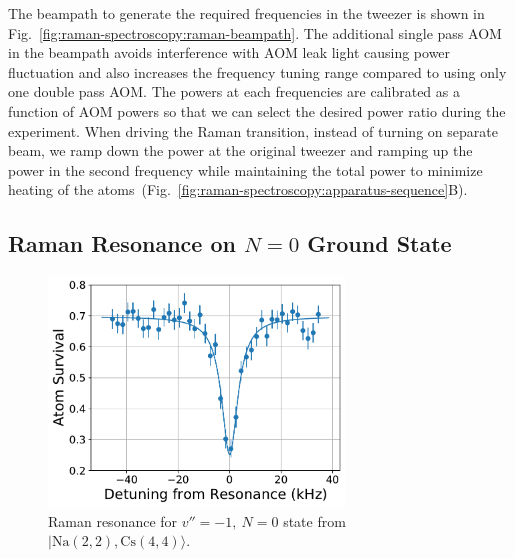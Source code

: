 The beampath to generate the required frequencies in the tweezer is shown in
Fig.~\ref{fig:raman-spectroscopy:raman-beampath}.
The additional single pass AOM in the beampath avoids interference
with AOM leak light causing power fluctuation and
also increases the frequency tuning range compared to using only one double pass AOM.
The powers at each frequencies are calibrated as a function of AOM powers
so that we can select the desired power ratio during the experiment.
When driving the Raman transition, instead of turning on separate beam,
we ramp down the power at the original tweezer and ramping up the power
in the second frequency while maintaining the total power to minimize heating of
the atoms~(Fig.~\ref{fig:raman-spectroscopy:apparatus-sequence}B).

\subsection{Raman Resonance on \texorpdfstring{$N=0$}{N=0} Ground State}
\label{ch:raman-spectroscopy:states:n0}

\begin{figure}
  \centering
  \includegraphics[width=0.7\textwidth]{figures/raman_spectroscopy_resonance.pdf}
  \caption[Raman resonance for $v''=-1,\ N=0$ state]{
    Raman resonance for $v''=-1,\ N=0$ state from $|\mathrm{Na(2, 2),Cs(4, 4)}\rangle$.
    \label{fig:raman-spectroscopy:resonance}}
\end{figure}


